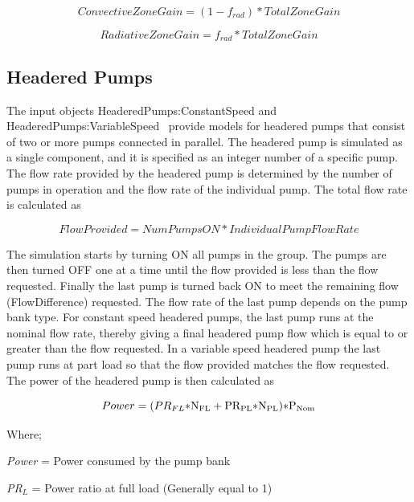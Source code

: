 \begin{equation}
ConvectiveZoneGain = \left( {1 - {f_{rad}}} \right)*TotalZoneGain
\end{equation}

\begin{equation}
RadiativeZoneGain = {f_{rad}}*TotalZoneGain
\end{equation}

\subsection{Headered Pumps}\label{headered-pumps}

The input objects HeaderedPumps:ConstantSpeed and HeaderedPumps:VariableSpeed ~provide models for headered pumps that consist of two or more pumps connected in parallel. The headered pump is simulated as a single component, and it is specified as an integer number of a specific pump. The flow rate provided by the headered pump is determined by the number of pumps in operation and the flow rate of the individual pump. The total flow rate is calculated as

\begin{equation}
FlowProvided = NumPumpsON*IndividualPumpFlowRate
\end{equation}

The simulation starts by turning ON all pumps in the group. The pumps are then turned OFF one at a time until the flow provided is less than the flow requested. Finally the last pump is turned back ON to meet the remaining flow (FlowDifference) requested. The flow rate of the last pump depends on the pump bank type. For constant speed headered pumps, the last pump runs at the nominal flow rate, thereby giving a final headered pump flow which is equal to or greater than the flow requested. In a variable speed headered pump the last pump runs at part load so that the flow provided matches the flow requested. The power of the headered pump is then calculated as

\begin{equation}
Power = (P{R_{FL}}{\rm{*N}}{}_{{\rm{FL}}} + {\rm{P}}{{\rm{R}}_{{\rm{PL}}}}{\rm{*}}{{\rm{N}}_{{\rm{PL}}}}{\rm{)*}}{{\rm{P}}_{{\rm{Nom}}}}{\rm{  }}
\end{equation}

Where;

\emph{Power} = Power consumed by the pump bank

\emph{PR\(_{L}\)} = Power ratio at full load (Generally equal to 1)

